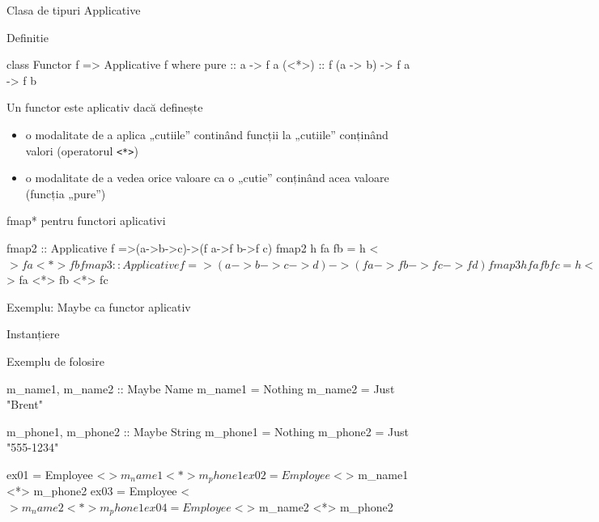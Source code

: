 \documentclass[xcolor=pdftex,romanian,colorlinks]{beamer}
\begin{document}
\begin{frame}[fragile]{Clasa de tipuri Applicative}
\begin{block}{Definitie}
\vspace{-1ex}
\begin{asciihs}
class Functor f => Applicative f where
  pure  :: a -> f a
  (<*>) :: f (a -> b) -> f a -> f b
\end{asciihs}
\vspace{-1ex}
Un functor este aplicativ dacă definește 
\begin{itemize}
\item o modalitate de a aplica „cutiile” continând funcții la „cutiile” conținând valori (operatorul \lstinline$<*>$)
\item o modalitate de a vedea orice valoare ca o „cutie” conținând acea valoare (funcția „pure”)
\end{itemize}
\end{block}

\begin{block}{fmap* pentru functori aplicativi}
\vspace{-1ex}
\begin{asciihs}
fmap2 :: Applicative f =>(a->b->c)->(f a->f b->f c)
fmap2 h fa fb = h <$> fa <*> fb

fmap3 :: Applicative f =>(a->b->c->d)->(f a->f b->f c->f d)
fmap3 h fa fb fc = h <$> fa <*> fb <*> fc
\end{asciihs}
\vspace{-1ex}
\end{block}
\end{frame}

\begin{frame}[fragile]{Exemplu: Maybe ca functor aplicativ}
\begin{block}{Instanțiere}
\vspace{-1.5ex}
\vspace{-1ex}
\end{block}
\begin{block}{Exemplu de folosire}
\vspace{-1.5ex}
\begin{asciihs}
m_name1, m_name2 :: Maybe Name
m_name1 = Nothing                 m_name2 = Just "Brent"

m_phone1, m_phone2 :: Maybe String
m_phone1 = Nothing                m_phone2 = Just "555-1234"

ex01 = Employee <$> m_name1 <*> m_phone1
ex02 = Employee <$> m_name1 <*> m_phone2
ex03 = Employee <$> m_name2 <*> m_phone1
ex04 = Employee <$> m_name2 <*> m_phone2
\end{asciihs}
\end{block}
\end{frame}
\end{document}
